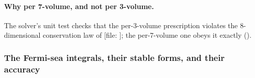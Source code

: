 \paragraph{Why per 7-volume, and not per 3-volume.} The solver's unit test
 checks that the per-3-volume
prescription violates the 8-dimensional conservation law of  [file:
]; the per-7-volume one obeys it exactly
().

\subsubsection{The Fermi-sea integrals, their stable forms, and their accuracy}
\label{sec:4.5.2}

